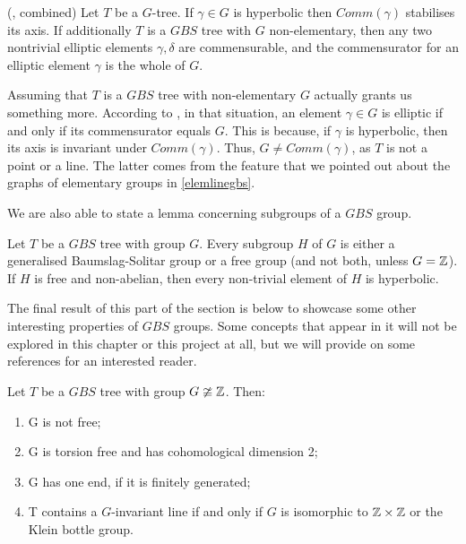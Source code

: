 \begin{lemma} (\cite[2.5]{For03}, \cite[2.1]{Le07} combined)\label{ellipticcomm}
    Let $T$ be a $G$-tree. If $\gamma \in G$ is hyperbolic then $Comm(\gamma)$ stabilises its axis. If additionally $T$ is a $GBS$ tree with $G$ non-elementary, then any two nontrivial elliptic elements $\gamma,\delta$ are commensurable, and the commensurator for an elliptic element $\gamma$ is the whole of $G$.
\end{lemma}

\begin{remark}
    Assuming that $T$ is a $GBS$ tree with non-elementary $G$ actually grants us something more. According to \cite[2.1]{Le07}, in that situation, an element $\gamma \in G$ is elliptic if and only if its commensurator equals $G$. This is because, if $\gamma$ is hyperbolic, then its axis is invariant under $Comm(\gamma)$. Thus, $G \neq Comm(\gamma)$, as $T$ is not a point or a line. The latter comes from the feature that we pointed out about the graphs of elementary groups in \ref{elemlinegbs}.
\end{remark}

We are also able to state a lemma concerning subgroups of a $GBS$ group.

\begin{lemma}
    Let $T$ be a $GBS$ tree with group $G$. Every subgroup $H$ of $G$ is either a generalised Baumslag-Solitar group or a free group (and not both, unless $G = \mathbb{Z}$). If $H$ is free and non-abelian, then every non-trivial element of $H$ is hyperbolic.
\end{lemma}

The final result of this part of the section is below to showcase some other interesting properties of $GBS$ groups. Some concepts that appear in it will not be explored in this chapter or this project at all, but we will provide on some references for an interested reader.

\begin{lemma}
    Let $T$ be a $GBS$ tree with group $G \ncong \mathbb{Z}$. Then:
   \begin{enumerate}
        \item G is not free;
        \item G is torsion free and has cohomological dimension 2;
        \item G has one end, if it is finitely generated;
        \item T contains a $G$-invariant line if and only if $G$ is isomorphic to $\mathbb{Z} \times \mathbb{Z}$ or the Klein bottle group.
    \end{enumerate}  
\end{lemma}

